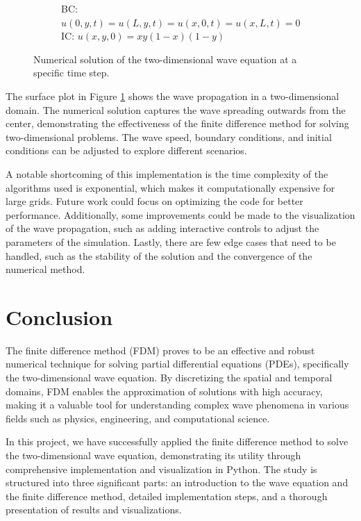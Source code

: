 \documentclass{article}
\begin{document}
\begin{figure}[htbp]
\begin{subfigure}{0.45\textwidth}
        \caption{BC: \(u(0, y, t) = u(L, y, t) = u(x, 0, t) = u(x, L, t) = 0\)\\ IC: \(u(x, y, 0) = x y (1-x) (1-y)\)}
    \end{subfigure}
    \caption{Numerical solution of the two-dimensional wave equation at a specific time step.}
    \label{fig:2d-wave}
\end{figure}

The surface plot in Figure \ref{fig:2d-wave} shows the wave propagation in a
two-dimensional domain. The numerical solution captures the wave spreading
outwards from the center, demonstrating the effectiveness of the finite
difference method for solving two-dimensional problems. The wave speed,
boundary conditions, and initial conditions can be adjusted to explore
different scenarios.

A notable shortcoming of this implementation is the time complexity of the
algorithms used is exponential, which makes it computationally expensive for
large grids. Future work could focus on optimizing the code for better
performance. Additionally, some improvements could be made to the visualization
of the wave propagation, such as adding interactive controls to adjust the
parameters of the simulation. Lastly, there are few edge cases that need to be
handled, such as the stability of the solution and the convergence of the
numerical method.

\newpage

\section{Conclusion}

The finite difference method (FDM) proves to be an effective and robust
numerical technique for solving partial differential equations (PDEs),
specifically the two-dimensional wave equation. By discretizing the spatial and
temporal domains, FDM enables the approximation of solutions with high
accuracy, making it a valuable tool for understanding complex wave phenomena in
various fields such as physics, engineering, and computational science.

In this project, we have successfully applied the finite difference method to
solve the two-dimensional wave equation, demonstrating its utility through
comprehensive implementation and visualization in Python. The study is
structured into three significant parts: an introduction to the wave equation
and the finite difference method, detailed implementation steps, and a thorough
presentation of results and visualizations.
\end{document}
